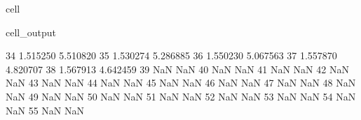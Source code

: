 \documentclass[letterpaper,10pt,english]{jupyterBook}
\begin{document}
\begin{sphinxuseclass}{cell}
\begin{sphinxVerbatimOutput}
\begin{sphinxuseclass}{cell_output}
\begin{sphinxVerbatim}[commandchars=\\\{\}]
					34                1.515250                    \PYGZhy{}5.510820   
					35                1.530274                    \PYGZhy{}5.286885   
					36                1.550230                    \PYGZhy{}5.067563   
					37                1.557870                    \PYGZhy{}4.820707   
					38                1.567913                    \PYGZhy{}4.642459   
					39                     NaN                          NaN   
					40                     NaN                          NaN   
					41                     NaN                          NaN   
					42                     NaN                          NaN   
					43                     NaN                          NaN   
					44                     NaN                          NaN   
					45                     NaN                          NaN   
					46                     NaN                          NaN   
					47                     NaN                          NaN   
					48                     NaN                          NaN   
					49                     NaN                          NaN   
					50                     NaN                          NaN   
					51                     NaN                          NaN   
					52                     NaN                          NaN   
					53                     NaN                          NaN   
					54                     NaN                          NaN   
					55                     NaN                          NaN   
					

\end{sphinxVerbatim}
\end{sphinxuseclass}
\end{sphinxVerbatimOutput}
\end{sphinxuseclass}
\end{document}
